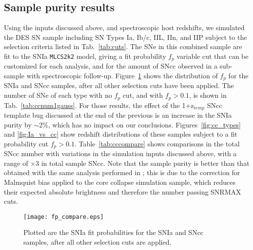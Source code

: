 \documentclass[preprint2]{aastex}    %
\newcommand{\mlcs}{{\tt MLCS2k2}}
\begin{document}
\subsection{Sample purity results}

Using the inputs discussed above, and spectroscopic host redshifts, 
we simulated the DES SN sample including
SN Types Ia, Ib/c, IIL, IIn, and IIP subject to the selection criteria listed 
in Tab.~\ref{tab:cuts}. The SNe in this combined sample are fit to the 
SNIa {\mlcs} model, giving a fit probability $f_p$ variable cut that can be 
customized for each analysis, and for the amount of SNcc observed in a 
sub-sample with spectroscopic follow-up. Figure~\ref{fig:fp} shows the 
distribution of $f_p$ for the SNIa and SNcc samples,  after all other
selection cuts have been applied.  The number of SNe of each type with 
no $f_p$ cut, and with $f_p>0.1$, is shown in
Tab.~\ref{tab:ccnum1gauss}. For those results, the effect of the 1+z$_{temp}$ 
SNcc template bug discussed at the end of the previous 
is an increase in the SNIa purity by $\sim$2\%, 
which has no impact on our conclusions.
Figures~\ref{fig:cc_types} 
and \ref{fig:Ia_vs_cc} show redshift distributions of these samples 
subject to a
fit probability cut $f_p>0.1$. Table~\ref{tab:cccompare} shows comparisons
in the total SNcc number with variations in the simulation inputs discussed 
above, with a range of $\times 3$ in total sample SNcc.  
Note that the sample purity is better than that
obtained with the same analysis performed in \cite{SNchall};  this
is due to the correction for Malmquist bias applied to 
the core collapse simulation sample, which reduces their 
expected absolute brightness and therefore the number passing
SNRMAX cuts.

\begin{figure}
\begin{center}
\texttt{[image: fp\_compare.eps]}
\caption{Plotted are the SNIa fit probabilities for the SNIa and 
SNcc samples,  after all other selection cuts are applied.}
\label{fig:fp}
\end{center}
\end{figure}
\end{document}
